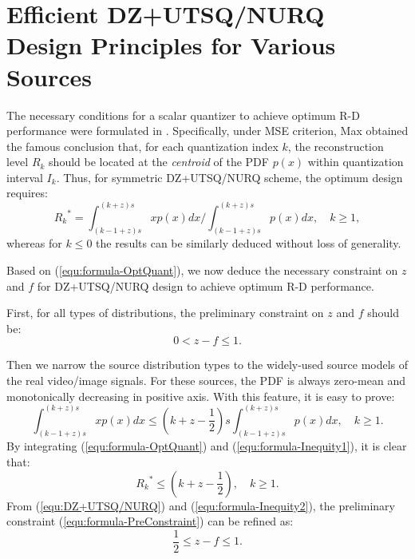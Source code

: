 \documentclass[smallabstract,smallcaptions]{dccpaper}
\begin{document}
\section{Efficient DZ+UTSQ/NURQ Design Principles for Various Sources}
\label{sec:principle}

The necessary conditions for a scalar quantizer to achieve optimum R-D performance were formulated in \cite{Farvardin_TIT1984}. Specifically, under MSE criterion, Max \cite{Max_TIT1960} obtained the famous conclusion that, for each quantization index $k$, the reconstruction level $R_k$ should be located at the \emph{centroid} of the PDF $p(x)$ within quantization interval $I_k$. Thus, for symmetric DZ+UTSQ/NURQ scheme, the optimum design requires:
\begin{equation}\label{equ:formula-OptQuant}
	{R_k}^* = \int_{(k-1+z)s}^{(k+z)s} xp(x)dx / \int_{(k-1+z)s}^{(k+z)s} p(x)dx, \quad k \ge 1,
\end{equation}
whereas for $k \le 0$ the results can be similarly deduced without loss of generality.

Based on (\ref{equ:formula-OptQuant}), we now deduce the necessary constraint on $z$ and $f$ for DZ+UTSQ/NURQ design to achieve optimum R-D performance.

First, for all types of distributions, the preliminary constraint on $z$ and $f$ should be:
\begin{equation}\label{equ:formula-PreConstraint}
	 0 < z - f \le 1. 
\end{equation}

Then we narrow the source distribution types to the widely-used source models of the real video/image signals. For these sources, the PDF is always zero-mean and monotonically decreasing in positive axis. With this feature, it is easy to prove:
\begin{equation}\label{equ:formula-Inequity1}
	\int_{(k-1+z)s}^{(k+z)s} xp(x)dx \le (k+z-\frac{1}{2}) s \int_{(k-1+z)s}^{(k+z)s} p(x)dx, \quad k \ge 1.
\end{equation}
By integrating (\ref{equ:formula-OptQuant}) and (\ref{equ:formula-Inequity1}), it is clear that:
\begin{equation}\label{equ:formula-Inequity2}
	{R_k}^* \le (k+z-\frac{1}{2}), \quad k \ge 1.
\end{equation}
From (\ref{equ:DZ+UTSQ/NURQ}) and (\ref{equ:formula-Inequity2}), the preliminary constraint (\ref{equ:formula-PreConstraint}) can be refined as:
\begin{equation}\label{equ:formula-RefConstraint}
	\frac{1}{2} \le z - f \le 1. 
\end{equation}
\end{document}
